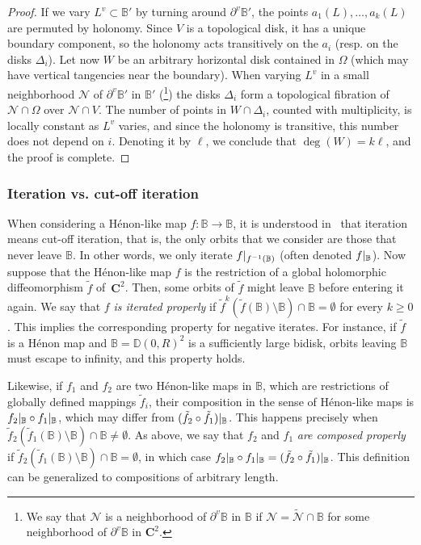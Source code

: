\documentclass[oneside, 12pt]{amsart}
\newcommand{\disk}{\mathbb{D}}
\newcommand{\fr}{\partial}
\newcommand{\rest}[1]{ \arrowvert_{#1}}
\newcommand{\inv}{^{-1}}
\newcommand{\C}{\mathbf{C}}
\newcommand{\bb}{\mathbb{B}}
\theoremstyle{plain}
\theoremstyle{definition}
\numberwithin{equation}{section}       %
\numberwithin{equation}{section}       %
\begin{document}
\begin{proof}
If we vary $L^v\subset \bb'$ by turning around $\fr^v\bb'$, the points $ {a_1(L), \ldots , a_{k}(L)}$ are permuted by holonomy. 
Since  $V$ is a topological disk, it has a unique boundary component, 
 so the holonomy acts transitively on the $a_i$ (resp. on the disks $\Delta_i$). 
Let now $W$ be an arbitrary horizontal disk contained in $\Omega$ 
(which may have vertical tangencies near the boundary). 
 When varying $L^v$ in a small neighborhood $\mathcal N$ of $\fr^v\bb'$  in $\bb'$ (\footnote{We   say that $\mathcal N$ is a neighborhood of $\fr^v\bb$ in $\bb$ if $\mathcal N =\widetilde {\mathcal N}\cap \bb$ for some neighborhood of $\fr^v\bb$ in $\C^2$. })
 the disks $\Delta_i$ form a topological fibration of $\mathcal N\cap \Omega$ over $ \mathcal N\cap V$. 
 The number of points in $W\cap \Delta_i$, counted with multiplicity, is locally constant as $L^v$ varies, 
 and since the holonomy is transitive,  this number does not depend on $i$. 
Denoting it by $\ell$,  we conclude that $\deg(W) = k\ell$, and the proof is complete. 
\end{proof}


\subsubsection{Iteration vs. cut-off iteration}\label{par:iteration_henon_like}
When considering a Hénon-like map $f\colon \bb\to \bb$, it is understood in~\cite{henonl}  that 
iteration means cut-off iteration, that is, 
 the only orbits that we consider are  those that never leave $\bb$. In other words, we  only iterate $f\rest{f\inv(\bb)}$ (often denoted $f\rest{\bb}$). 
 Now suppose that the Hénon-like map $f$ is the restriction of a global holomorphic diffeomorphism $\tilde f$ of~$\C^2$. Then, some orbits of $\tilde f$ might leave $\bb$ before entering it again. 
 We say that 
 $f$ \emph{is iterated properly} if ${\tilde f}^k({\tilde f}(\bb)\setminus \bb) \cap \bb= \emptyset$  for every $k\geq 0$. This implies the corresponding property for negative iterates. For instance, if $\tilde f$ is a Hénon map and $\bb = \disk(0, R)^2$   is a sufficiently large bidisk,  orbits  leaving $\bb$ must escape to infinity, and this property holds. 
 
Likewise, if $f_1$ and $f_2$ are two Hénon-like maps in $\bb$, which are restrictions of globally defined mappings $\tilde f_i$, their composition in the sense of Hénon-like maps is $f_2\rest{\bb}\circ f_1\rest{\bb}$, which  may differ from $(\tilde f_2\circ \tilde f_1)\rest{\bb}$. 
This happens precisely when $\tilde f_2(\tilde f_1(\bb)\setminus\bb)\cap \bb\neq \emptyset$. 
As above, we say that $f_2$ and $f_1$ \emph{are composed properly} if  
$\tilde f_2(\tilde f_1(\bb)\setminus\bb)\cap \bb= \emptyset$, in which case $f_2\rest{\bb}\circ f_1\rest{\bb}=(\tilde f_2\circ \tilde f_1)\rest{\bb}$. 
This definition can be generalized to compositions of arbitrary length. 
\end{document}
